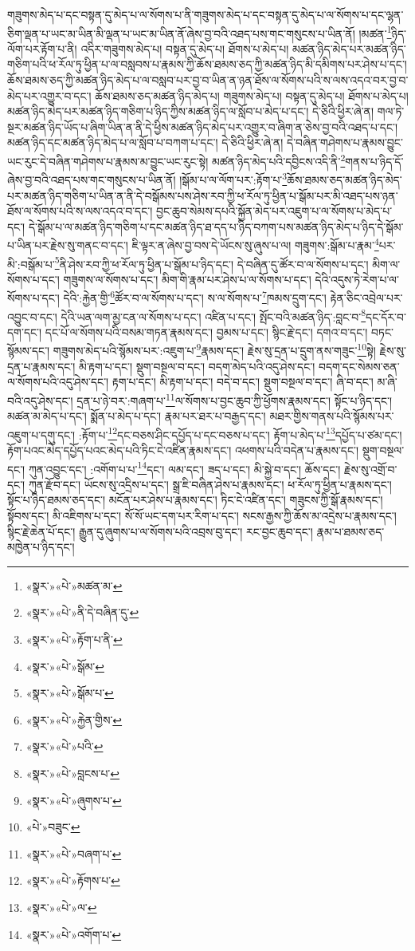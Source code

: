 གཟུགས་མེད་པ་དང་བསྟན་དུ་མེད་པ་ལ་སོགས་པ་ནི་གཟུགས་མེད་པ་དང་བསྟན་དུ་མེད་པ་ལ་སོགས་པ་དང་ལྷན་ཅིག་ལྡན་པ་ཡང་མ་ཡིན་མི་ལྡན་པ་ཡང་མ་ཡིན་ནོ་ཞེས་བྱ་བའི་འཐད་པས་གང་གསུངས་པ་ཡིན་ནོ། །མཚན་\footnote{«སྣར་»«པེ་»མཚན་མ་}ཉིད་ལོག་པར་རྟོག་པ་ནི། འདིར་གཟུགས་མེད་པ། བསྟན་དུ་མེད་པ། ཐོགས་པ་མེད་པ། མཚན་ཉིད་མེད་པར་མཚན་ཉིད་གཅིག་པའི་ཕ་རོལ་ཏུ་ཕྱིན་པ་ལ་བསླབས་པ་རྣམས་ཀྱི་ཆོས་ཐམས་ཅད་ཀྱི་མཚན་ཉིད་མི་དམིགས་པར་ཤེས་པ་དང་། ཆོས་ཐམས་ཅད་ཀྱི་མཚན་ཉིད་མེད་པ་ལ་བསླབ་པར་བྱ་བ་ཡིན་ན་ཉན་ཐོས་ལ་སོགས་པའི་ས་ལས་འདའ་བར་བྱ་བ་མེད་པར་འགྱུར་བ་དང་། ཆོས་ཐམས་ཅད་མཚན་ཉིད་མེད་པ། གཟུགས་མེད་པ། བསྟན་དུ་མེད་པ། ཐོགས་པ་མེད་པ། མཚན་ཉིད་མེད་པར་མཚན་ཉིད་གཅིག་པ་ཉིད་ཀྱིས་མཚན་ཉིད་ལ་སློབ་པ་མེད་པ་དང་། དེ་ཅིའི་ཕྱིར་ཞེ་ན། གལ་ཏེ་སྔར་མཚན་ཉིད་ཡོད་པ་ཞིག་ཡིན་ན་ནི་དེ་ཕྱིས་མཚན་ཉིད་མེད་པར་འགྱུར་བ་ཞིག་ན་ཅེས་བྱ་བའི་འཐད་པ་དང་། མཚན་ཉིད་དང་མཚན་ཉིད་མེད་པ་ལ་སློབ་པ་བཀག་པ་དང་། དེ་ཅིའི་ཕྱིར་ཞེ་ན། དེ་བཞིན་གཤེགས་པ་རྣམས་བྱུང་ཡང་རུང་དེ་བཞིན་གཤེགས་པ་རྣམས་མ་བྱུང་ཡང་རུང་སྟེ། མཚན་ཉིད་མེད་པའི་དབྱིངས་འདི་ནི་\footnote{«སྣར་»«པེ་»ནི་དེ་བཞིན་དུ་}གནས་པ་ཉིད་དོ་ཞེས་བྱ་བའི་འཐད་པས་གང་གསུངས་པ་ཡིན་ནོ། །སྒོམ་པ་ལ་ལོག་པར་:རྟོག་པ་\footnote{«སྣར་»«པེ་»རྟོག་པ་ནི་}ཆོས་ཐམས་ཅད་མཚན་ཉིད་མེད་པར་མཚན་ཉིད་གཅིག་པ་ཡིན་ན་ནི་དེ་བསྒོམས་པས་ཤེས་རབ་ཀྱི་ཕ་རོལ་ཏུ་ཕྱིན་པ་སྒོམ་པར་མི་འཐད་པས་ཉན་ཐོས་ལ་སོགས་པའི་ས་ལས་འདའ་བ་དང་། བྱང་ཆུབ་སེམས་དཔའི་སྐྱོན་མེད་པར་འཇུག་པ་ལ་སོགས་པ་མེད་པ་དང་། དེ་སྒོམ་པ་ལ་མཚན་ཉིད་གཅིག་པ་དང་མཚན་ཉིད་ཐ་དད་པ་ཉིད་བཀག་པས་མཚན་ཉིད་མེད་པ་ཉིད་དེ་སྒོམ་པ་ཡིན་པར་རྗེས་སུ་གནང་བ་དང་། ཇི་ལྟར་ན་ཞེས་བྱ་བས་དེ་ཡོངས་སུ་ཞུས་པ་ལ། གཟུགས་:སྒོམ་པ་རྣམ་\footnote{«སྣར་»«པེ་»སྒོམ་}པར་མི་:བསྒོམ་པ་\footnote{«སྣར་»«པེ་»སྒོམ་པ་}ནི་ཤེས་རབ་ཀྱི་ཕ་རོལ་ཏུ་ཕྱིན་པ་སྒོམ་པ་ཉིད་དང་། དེ་བཞིན་དུ་ཚོར་བ་ལ་སོགས་པ་དང་། མིག་ལ་སོགས་པ་དང་། གཟུགས་ལ་སོགས་པ་དང་། མིག་གི་རྣམ་པར་ཤེས་པ་ལ་སོགས་པ་དང་། དེའི་འདུས་ཏེ་རེག་པ་ལ་སོགས་པ་དང་། དེའི་:རྐྱེན་གྱི་\footnote{«སྣར་»«པེ་»རྐྱེན་གྱིས་}ཚོར་བ་ལ་སོགས་པ་དང་། ས་ལ་སོགས་པ་\footnote{«སྣར་»«པེ་»པའི་}ཁམས་དྲུག་དང་། རྟེན་ཅིང་འབྲེལ་པར་འབྱུང་བ་དང་། དེའི་ཡན་ལག་མྱ་ངན་ལ་སོགས་པ་དང་། འཛིན་པ་དང་། སྤོང་བའི་མཚན་ཉིད་:བླང་བ་\footnote{«སྣར་»«པེ་»བླངས་པ་}དང་དོར་བ་དག་དང་། དང་པོ་ལ་སོགས་པའི་བསམ་གཏན་རྣམས་དང་། བྱམས་པ་དང་། སྙིང་རྗེ་དང་། དགའ་བ་དང་། བཏང་སྙོམས་དང་། གཟུགས་མེད་པའི་སྙོམས་པར་:འཇུག་པ་\footnote{«སྣར་»«པེ་»ཞུགས་པ་}རྣམས་དང་། རྗེས་སུ་དྲན་པ་དྲུག་ནས་གཟུང་\footnote{«པེ་»བཟུང་}སྟེ། རྗེས་སུ་དྲན་པ་རྣམས་དང་། མི་རྟག་པ་དང་། སྡུག་བསྔལ་བ་དང་། བདག་མེད་པའི་འདུ་ཤེས་དང་། བདག་དང་སེམས་ཅན་ལ་སོགས་པའི་འདུ་ཤེས་དང་། རྟག་པ་དང་། མི་རྟག་པ་དང་། བདེ་བ་དང་། སྡུག་བསྔལ་བ་དང་། ཞི་བ་དང་། མ་ཞི་བའི་འདུ་ཤེས་དང་། དྲན་པ་ཉེ་བར་:གཞག་པ་\footnote{«སྣར་»«པེ་»བཞག་པ་}ལ་སོགས་པ་བྱང་ཆུབ་ཀྱི་ཕྱོགས་རྣམས་དང་། སྟོང་པ་ཉིད་དང་། མཚན་མ་མེད་པ་དང་། སྨོན་པ་མེད་པ་དང་། རྣམ་པར་ཐར་པ་བརྒྱད་དང་། མཐར་གྱིས་གནས་པའི་སྙོམས་པར་འཇུག་པ་དགུ་དང་། :རྟོག་པ་\footnote{«སྣར་»«པེ་»རྟོགས་པ་}དང་བཅས་ཤིང་དཔྱོད་པ་དང་བཅས་པ་དང་། རྟོག་པ་མེད་པ་\footnote{«སྣར་»«པེ་»ལ་}དཔྱོད་པ་ཙམ་དང་། རྟོག་པའང་མེད་དཔྱོད་པའང་མེད་པའི་ཏིང་ངེ་འཛིན་རྣམས་དང་། འཕགས་པའི་བདེན་པ་རྣམས་དང་། སྡུག་བསྔལ་དང་། ཀུན་འབྱུང་དང་། :འགོག་པ་པ་\footnote{«སྣར་»«པེ་»འགོག་པ་}དང་། ལམ་དང་། ཟད་པ་དང་། མི་སྐྱེ་བ་དང་། ཆོས་དང་། རྗེས་སུ་འགྲོ་བ་དང་། ཀུན་རྫོབ་དང་། ཡོངས་སུ་འདྲིས་པ་དང་། སྒྲ་ཇི་བཞིན་ཤེས་པ་རྣམས་དང་། ཕ་རོལ་ཏུ་ཕྱིན་པ་རྣམས་དང་། སྟོང་པ་ཉིད་ཐམས་ཅད་དང་། མངོན་པར་ཤེས་པ་རྣམས་དང་། ཏིང་ངེ་འཛིན་དང་། གཟུངས་ཀྱི་སྒོ་རྣམས་དང་། སྟོབས་དང་། མི་འཇིགས་པ་དང་། སོ་སོ་ཡང་དག་པར་རིག་པ་དང་། སངས་རྒྱས་ཀྱི་ཆོས་མ་འདྲེས་པ་རྣམས་དང་། སྙིང་རྗེ་ཆེན་པོ་དང་། རྒྱུན་དུ་ཞུགས་པ་ལ་སོགས་པའི་འབྲས་བུ་དང་། རང་བྱང་ཆུབ་དང་། རྣམ་པ་ཐམས་ཅད་མཁྱེན་པ་ཉིད་དང་། 